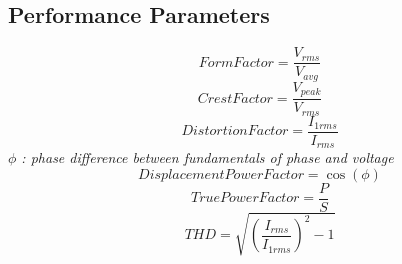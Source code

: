 \documentclass[twocolumn, ]{article}
\begin{document}
\subsection{Performance Parameters}
\begin{equation}
Form Factor=\frac{V_{rms}}{V_{avg}}
\end{equation}
\begin{equation}
Crest Factor=\frac{V_{peak}}{V_{rms}}
\end{equation}
\begin{equation}
Distortion Factor=\frac{I_{1rms}}{I_{rms}}
\end{equation}
\textit{$\phi$ : phase difference between fundamentals of phase and voltage}
\begin{equation}
Displacement Power Factor=\cos(\phi)
\end{equation}
\begin{equation}
True Power Factor=\frac{P}{S}
\end{equation}
\begin{equation}
THD=\sqrt{(\frac{I_{rms}}{I_{1rms}})^2-1}
\end{equation}
\end{document}
